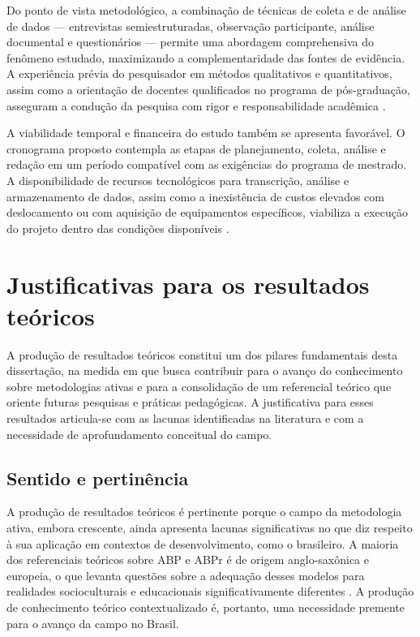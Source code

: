 Do ponto de vista metodológico, a combinação de técnicas de coleta e de análise de dados — entrevistas semiestruturadas, observação participante, análise documental e questionários — permite uma abordagem comprehensiva do fenômeno estudado, maximizando a complementaridade das fontes de evidência. A experiência prévia do pesquisador em métodos qualitativos e quantitativos, assim como a orientação de docentes qualificados no programa de pós-graduação, asseguram a condução da pesquisa com rigor e responsabilidade acadêmica \cite{BARDIN2016}.

A viabilidade temporal e financeira do estudo também se apresenta favorável. O cronograma proposto contempla as etapas de planejamento, coleta, análise e redação em um período compatível com as exigências do programa de mestrado. A disponibilidade de recursos tecnológicos para transcrição, análise e armazenamento de dados, assim como a inexistência de custos elevados com deslocamento ou com aquisição de equipamentos específicos, viabiliza a execução do projeto dentro das condições disponíveis \cite{CRESWELL2018}.

\section{Justificativas para os resultados teóricos}
\label{sec:justificativa_teoricos}

A produção de resultados teóricos constitui um dos pilares fundamentais desta dissertação, na medida em que busca contribuir para o avanço do conhecimento sobre metodologias ativas e para a consolidação de um referencial teórico que oriente futuras pesquisas e práticas pedagógicas. A justificativa para esses resultados articula-se com as lacunas identificadas na literatura e com a necessidade de aprofundamento conceitual do campo.

\subsection{Sentido e pertinência}
\label{subsec:jt_sentido}

A produção de resultados teóricos é pertinente porque o campo da metodologia ativa, embora crescente, ainda apresenta lacunas significativas no que diz respeito à sua aplicação em contextos de desenvolvimento, como o brasileiro. A maioria dos referenciais teóricos sobre ABP e ABPr é de origem anglo-saxônica e europeia, o que levanta questões sobre a adequação desses modelos para realidades socioculturais e educacionais significativamente diferentes \cite{BONWELL1991}. A produção de conhecimento teórico contextualizado é, portanto, uma necessidade premente para o avanço da campo no Brasil.

